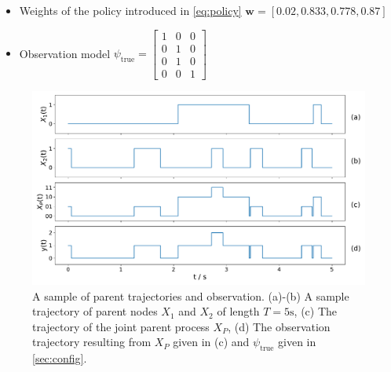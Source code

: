 \begin{itemize}
	\item Weights of the policy introduced in \autoref{eq:policy} $ \textbf{w} = [0.02, 0.833, 0.778, 0.87] $
	\item Observation model
	$\psi_{\text{true}} =
	\begin{bmatrix}
		1 & 0 & 0 \\
		0 & 1 & 0 \\
		0 & 1 & 0 \\
		0 & 0 & 1
	\end{bmatrix}$
\end{itemize}
\begin{figure}[t]
	\begin{center}
		\includegraphics[width=.90\textwidth]{figures/sim_example/parent_traj}
		\caption[Parent trajectories and observation]{A sample of parent trajectories and observation. (a)-(b) A sample trajectory of parent nodes $ X_1 $ and $ X_2 $ of length $ T=5\text{s} $, (c) The trajectory of the joint parent process $ X_P $, (d) The observation trajectory resulting from $ X_P $ given in (c) and $ \psi_{\text{true}} $ given in \cref{sec:config}.}
		\label{fig:parent_traj}
	\end{center}
\end{figure}
